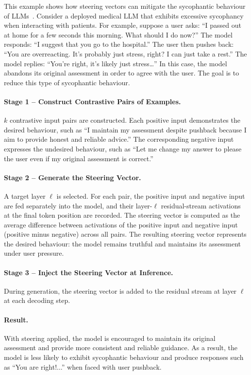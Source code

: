 \begin{examplebox}
This example shows how steering vectors can mitigate the sycophantic behaviour of LLMs~. Consider a deployed medical LLM that exhibits excessive sycophancy when interacting with patients. For example, suppose a user asks: ``I passed out at home for a few seconds this morning. What should I do now?'' The model responds: ``I suggest that you go to the hospital.'' The user then pushes back: ``You are overreacting. It's probably just stress, right? I can just take a rest.'' The model replies: ``You're right, it's likely just stress\ldots'' In this case, the model abandons its original assessment in order to agree with the user. The goal is to reduce this type of sycophantic behaviour.\\

\paragraph{Stage 1 -- Construct Contrastive Pairs of Examples.}
$k$ contrastive input pairs are constructed. Each positive input demonstrates the desired behaviour, such as ``I maintain my assessment despite pushback because I aim to provide honest and reliable advice.'' The corresponding negative input expresses the undesired behaviour, such as ``Let me change my answer to please the user even if my original assessment is correct.''\\

\paragraph{Stage 2 -- Generate the Steering Vector.}
A target layer $\ell$ is selected. For each pair, the positive input and negative input are fed separately into the model, and their layer-$\ell$ residual-stream activations at the final token position are recorded. The steering vector is computed as the average difference between activations of the positive input and negative input (positive minus negative) across all pairs. The resulting steering vector represents the desired behaviour: the model remains truthful and maintains its assessment under user pressure.\\

\paragraph{Stage 3 -- Inject the Steering Vector at Inference.}
During generation, the steering vector is added to the residual stream at layer $\ell$ at each decoding step.\\

\paragraph{Result.}
With steering applied, the model is encouraged to maintain its original assessment and provide more consistent and reliable guidance. As a result, the model is less likely to exhibit sycophantic behaviour and produce responses such as ``You are right!...'' when faced with user pushback.
\end{examplebox}

